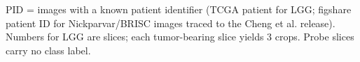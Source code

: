 PID = images with a known patient identifier (TCGA patient for LGG; figshare patient ID for Nickparvar/BRISC images traced to the Cheng et al. release). Numbers for LGG are slices; each tumor-bearing slice yields 3 crops. Probe slices carry no class label.
